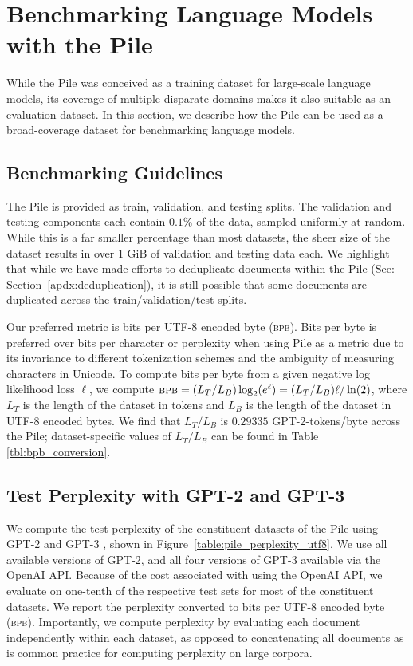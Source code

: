 \section{Benchmarking Language Models with the Pile}

While the Pile was conceived as a training dataset for large-scale language models, its coverage of multiple disparate domains makes it also suitable as an evaluation dataset. In this section, we describe how the Pile can be used as a broad-coverage dataset for benchmarking language models.

\subsection{Benchmarking Guidelines}

The Pile is provided as train, validation, and testing splits. The validation and testing components each contain $0.1\%$ of the data, sampled uniformly at random. While this is a far smaller percentage than most datasets, the sheer size of the dataset results in over 1 GiB of validation and testing data each. We highlight that while we have made efforts to deduplicate documents within the Pile (See: Section~\ref{apdx:deduplication}), it is still possible that some documents are duplicated across the train/validation/test splits.

Our preferred metric is bits per UTF-8 encoded byte (\textsc{bpb}). Bits per byte is preferred over bits per character or perplexity when using Pile as a metric due to its invariance to different tokenization schemes and the ambiguity of measuring characters in Unicode. To compute bits per byte from a given negative log likelihood loss $\ell$, we compute $\textsc{bpb} = (L_T/L_B) \log_2(e^\ell) = (L_T/L_B) \ell / \ln(2)$, where $L_T$ is the length of the dataset in tokens and $L_B$ is the length of the dataset in UTF-8 encoded bytes. We find that $L_T/L_B$ is $0.29335$ GPT-2-tokens/byte across the Pile; dataset-specific values of $L_T/L_B$ can be found in Table \ref{tbl:bpb_conversion}.

\subsection{Test Perplexity with GPT-2 and GPT-3}

We compute the test perplexity of the constituent datasets of the Pile using GPT-2 \citep{GPT2} and GPT-3 \citep{GPT3}, shown in Figure~\ref{table:pile_perplexity_utf8}. We use all available versions of GPT-2, and all four versions of GPT-3 available via the OpenAI API. Because of the cost associated with using the OpenAI API, we evaluate on one-tenth of the respective test sets for most of the constituent datasets. We report the perplexity converted to bits per UTF-8 encoded byte (\textsc{bpb}). Importantly, we compute perplexity by evaluating each document independently within each dataset, as opposed to concatenating all documents as is common practice for computing perplexity on large corpora.

